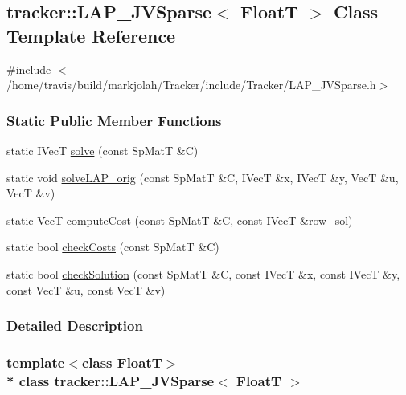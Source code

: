 \hypertarget{classtracker_1_1LAP__JVSparse}{}\subsection{tracker\+:\+:L\+A\+P\+\_\+\+J\+V\+Sparse$<$ FloatT $>$ Class Template Reference}
\label{classtracker_1_1LAP__JVSparse}


{\ttfamily \#include $<$/home/travis/build/markjolah/\+Tracker/include/\+Tracker/\+L\+A\+P\+\_\+\+J\+V\+Sparse.\+h$>$}

\subsubsection*{Static Public Member Functions}
\begin{DoxyCompactItemize}
\item 
static I\+VecT \hyperlink{classtracker_1_1LAP__JVSparse_aea34e1276a8b6d217bd08a8a3b1156a8}{solve} (const Sp\+MatT \&C)
\item 
static void \hyperlink{classtracker_1_1LAP__JVSparse_a2587babf5d28fee6c4e09659f492e58e}{solve\+L\+A\+P\+\_\+orig} (const Sp\+MatT \&C, I\+VecT \&x, I\+VecT \&y, VecT \&u, VecT \&v)
\item 
static VecT \hyperlink{classtracker_1_1LAP__JVSparse_a4d731a155829c5f7c587afa0e518fe62}{compute\+Cost} (const Sp\+MatT \&C, const I\+VecT \&row\+\_\+sol)
\item 
static bool \hyperlink{classtracker_1_1LAP__JVSparse_ada3eb6af3023ab78522072c9d36c593a}{check\+Costs} (const Sp\+MatT \&C)
\item 
static bool \hyperlink{classtracker_1_1LAP__JVSparse_a6ee562c47e27a223a7e4fae2f92b88aa}{check\+Solution} (const Sp\+MatT \&C, const I\+VecT \&x, const I\+VecT \&y, const VecT \&u, const VecT \&v)
\end{DoxyCompactItemize}


\subsubsection{Detailed Description}
\subsubsection*{template$<$class FloatT$>$\\*
class tracker\+::\+L\+A\+P\+\_\+\+J\+V\+Sparse$<$ Float\+T $>$}



